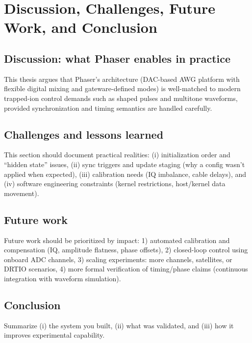 \chapter{Discussion, Challenges, Future Work, and Conclusion}
\label{ch:discussion_future}

\section{Discussion: what Phaser enables in practice}
This thesis argues that Phaser's architecture (DAC-based AWG platform with flexible digital mixing and
gateware-defined modes) is well-matched to modern trapped-ion control demands such as shaped pulses and
multitone waveforms, provided synchronization and timing semantics are handled carefully.


\section{Challenges and lessons learned}
This section should document practical realities:
(i) initialization order and ``hidden state'' issues,
(ii) sync triggers and update staging (why a config wasn't applied when expected),
(iii) calibration needs (IQ imbalance, cable delays),
and (iv) software engineering constraints (kernel restrictions, host/kernel data movement).


\section{Future work}
Future work should be prioritized by impact:
1) automated calibration and compensation (IQ, amplitude flatness, phase offsets),
2) closed-loop control using onboard ADC channels,
3) scaling experiments: more channels, satellites, or DRTIO scenarios,
4) more formal verification of timing/phase claims (continuous integration with waveform simulation).

\section{Conclusion}
Summarize (i) the system you built, (ii) what was validated, and (iii) how it improves experimental capability.
